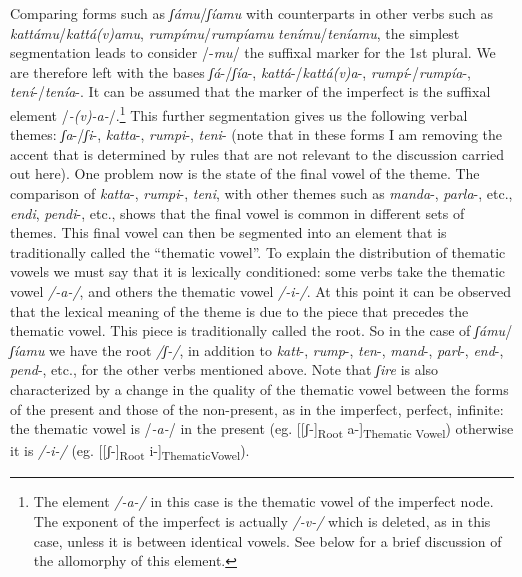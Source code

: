 \documentclass[output=paper]{langscibook}
\begin{document}
Comparing forms such as \textit{ʃámu}/\textit{ʃíamu} with counterparts in other verbs such as \textit{kattámu}/\textit{kattá(v)amu}, \textit{rumpímu}/\textit{rumpíamu} \textit{tenímu}/\textit{teníamu}, the simplest segmentation leads to consider /-\textit{mu}/ the suffixal marker for the 1st plural. We are therefore left with the bases  \textit{ʃá}-/\textit{ʃía}-, \textit{kattá}-/\textit{kattá(v)a}-, \textit{rumpí}-/\textit{rumpía}-, \textit{tení}-\slash\mbox{\textit{tenía}-}.  It can be assumed that the marker of the imperfect is  the suffixal element /\textit{-(v)-a-}/.\footnote{The element \textit{/-a-/} in this case is the thematic vowel of the imperfect node.  The exponent of the imperfect is actually \textit{/-v-/} which is deleted, as in this case, unless it is between identical vowels.  See below for a brief discussion of the allomorphy of this element.} This further segmentation gives us the following verbal themes:  \textit{ʃa}-/\textit{ʃi}-, \textit{katta}-, \textit{rumpi}-, \textit{teni}-  (note that in these forms I am removing the accent that is determined by rules that are not relevant to the discussion carried out here). One problem now is the state of the final vowel of the theme. The comparison of \textit{katta}-, \textit{rumpi}-, \textit{teni}, with other themes such as \textit{manda}-, \textit{parla}-, etc., \textit{endi}, \mbox{\textit{pendi}-},  etc., shows that the final vowel is common in different sets of  themes.  This final vowel can then be segmented into an element that is traditionally called  the “thematic vowel”. To explain the distribution of thematic vowels we must say that it is lexically  conditioned:  some verbs take the thematic  vowel  \textit{/-a-/}, and others the thematic vowel  \textit{/-i-/}. At this point it can be observed that the lexical meaning of the  theme  is  due to the piece that precedes the thematic vowel. This piece is traditionally called the root. So in the case of \textit{ʃámu}/\textit{ʃíamu}  we have the root \textit{/ʃ-/}, in addition to \textit{katt}-, \textit{rump}-, \textit{ten}-, \textit{mand}-, \textit{parl}-, \textit{end}-, \textit{pend}-, etc.,  for the other verbs mentioned above.  Note that  \textit{ʃire}  is also characterized by a change in the quality of the thematic vowel between the forms of the present and those of the non-present, as in the imperfect, perfect, infinite: the thematic vowel is \mbox{/\textit{-a-}/} in the present  (eg. [[ʃ-]\textsubscript{Root}  a-]\textsubscript{Thematic Vowel}) otherwise it is  \textit{/-i-/} (eg. [[ʃ-]\textsubscript{Root}  i-]\textsubscript{ThematicVowel}).
\end{document}
